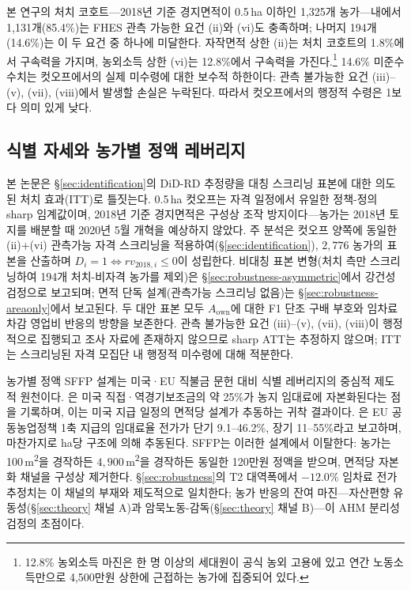 \documentclass[12pt, a4paper]{article}
\begin{document}
본 연구의 처치 코호트---2018년 기준 경지면적이 0.5\,ha 이하인 1,325개 농가---내에서 1,131개(85.4\%)는 FHES 관측 가능한 요건 (ii)와 (vi)도 충족하며; 나머지 194개(14.6\%)는 이 두 요건 중 하나에 미달한다. 자작면적 상한 (ii)는 처치 코호트의 1.8\%에서 구속력을 가지며, 농외소득 상한 (vi)는 12.8\%에서 구속력을 가진다.\footnote{12.8\% 농외소득 마진은 한 명 이상의 세대원이 공식 농외 고용에 있고 연간 노동소득만으로 4,500만원 상한에 근접하는 농가에 집중되어 있다.} 14.6\% 미준수 수치는 컷오프에서의 실제 미수령에 대한 보수적 하한이다: 관측 불가능한 요건 (iii)--(v), (vii), (viii)에서 발생할 손실은 누락된다. 따라서 컷오프에서의 행정적 수령은 1보다 의미 있게 낮다.

\subsection{식별 자세와 농가별 정액 레버리지}
\label{sec:institutional-identification}

본 논문은 \S\ref{sec:identification}의 DiD-RD 추정량을 대칭 스크리닝 표본에 대한 의도된 처치 효과(ITT)로 틀짓는다. 0.5\,ha 컷오프는 자격 일정에서 유일한 정책-정의 sharp 임계값이며, 2018년 기준 경지면적은 구성상 조작 방지이다---농가는 2018년 토지를 배분할 때 2020년 5월 개혁을 예상하지 않았다. 주 분석은 컷오프 양쪽에 동일한 (ii)+(vi) 관측가능 자격 스크리닝을 적용하여(\S\ref{sec:identification}), $2{,}776$ 농가의 표본을 산출하며 $D_i = 1 \iff rv_{2018,i} \le 0$이 성립한다. 비대칭 표본 변형(처치 측만 스크리닝하여 194개 처치-비자격 농가를 제외)은 \S\ref{sec:robustness-asymmetric}에서 강건성 검정으로 보고되며; 면적 단독 설계(관측가능 스크리닝 없음)는 \S\ref{sec:robustness-areaonly}에서 보고된다. 두 대안 표본 모두 $A_{\text{own}}$에 대한 F1 단조 구배 부호와 임차료 차감 영업비 반응의 방향을 보존한다. 관측 불가능한 요건 (iii)--(v), (vii), (viii)이 행정적으로 집행되고 조사 자료에 존재하지 않으므로 sharp ATT는 추정하지 않으며; ITT는 스크리닝된 자격 모집단 내 행정적 미수령에 대해 적분한다.

농가별 정액 SFFP 설계는 미국·EU 직불금 문헌 대비 식별 레버리지의 중심적 제도적 원천이다. \citet{Kirwan2009_rentcap}은 미국 직접·역경기보조금의 약 25\%가 농지 임대료에 자본화된다는 점을 기록하며, 이는 미국 지급 일정의 면적당 설계가 추동하는 귀착 결과이다. \citet{BaldoniCiaian2023_eucap}은 EU 공동농업정책 1축 지급의 임대료율 전가가 단기 9.1--46.2\%, 장기 11--55\%라고 보고하며, 마찬가지로 ha당 구조에 의해 추동된다. SFFP는 이러한 설계에서 이탈한다: 농가는 100\,m\textsuperscript{2}을 경작하든 $4{,}900$\,m\textsuperscript{2}을 경작하든 동일한 120만원 정액을 받으며, 면적당 자본화 채널을 구성상 제거한다. \S\ref{sec:robustness}의 T2 대역폭에서 $-12.0\%$ 임차료 전가 추정치는 이 채널의 부재와 제도적으로 일치한다; 농가 반응의 잔여 마진---자산편향 유동성(\S\ref{sec:theory} 채널 A)과 암묵노동-감독(\S\ref{sec:theory} 채널 B)---이 AHM 분리성 검정의 초점이다.
\end{document}
